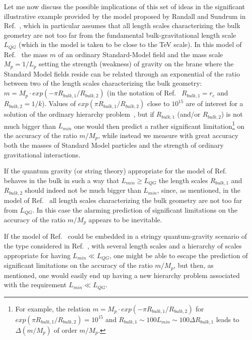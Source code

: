 Let me now discuss the possible implications of this set
of ideas in the significant illustrative example provided by
the model proposed by Randall and Sundrum in Ref.~\cite{rs1},
which in particular
assumes that all length
scales characterizing the bulk geometry are not too far from
the fundamental bulk-gravitational 
length scale $L_{QG}$ (which in the model \cite{rs1}
is taken to be close to the TeV scale).
In this model of Ref.~\cite{rs1} the mass $m$
of an ordinary Standard-Model
field and the mass scale $M_p = 1/L_p$ 
setting the strength (weakness) of gravity on the brane 
where the Standard Model fields reside
can be related through an exponential of 
the ratio between two of the length
scales characterizing the bulk
geometry: $m = M_p \cdot exp(- \pi R_{bulk,1}/R_{bulk,2})$
(in the notation of Ref.~\cite{rs1} $R_{bulk,1} = r_c$
and $R_{bulk,2} = 1/k$).
Values of $exp(\pi R_{bulk,1}/R_{bulk,2})$ close to $10^{15}$
are of interest for a solution of 
the ordinary hierarchy problem~\cite{rs1},
but if $R_{bulk,1}$ (and/or $R_{bulk,2}$)
is not much bigger than $L_{min}$ one would then 
predict a rather significant limitation\footnote{For example, 
the relation $m = M_p \cdot exp(- \pi R_{bulk,1}/R_{bulk,2})$
for $exp(\pi R_{bulk,1}/R_{bulk,2})=10^{15}$ 
and $R_{bulk,1} \sim 100 L_{min} \sim 100 \Delta R_{bulk,1}$
leads to $\Delta (m/M_p)$ of order $m/M_p$.}
on the accuracy of
the ratio $m/M_p$, while instead we measure 
with great accuracy both the masses of Standard Model particles
and the strength of ordinary gravitational interactions.

If the quantum gravity (or string theory) 
appropriate for the model of Ref.~\cite{rs1}
behaves in the bulk in such a way that
$L_{min} \ge L_{QG}$ the length scales 
$R_{bulk,1}$ and $R_{bulk,2}$
should indeed not be much bigger than $L_{min}$,
since, as mentioned,
in the model of Ref.~\cite{rs1} all length
scales characterizing the bulk geometry 
are not too far from $L_{QG}$.
In this case the alarming prediction
of significant limitations on the accuracy of
the ratio $m/M_p$ appears to be inevitable.

If the model of Ref.~\cite{rs1}
could be embedded in
a stringy quantum-gravity scenario 
of the type considered in Ref.~\cite{dbrscatt},
with several length scales
and a hierarchy of scales 
appropriate for having
$L_{min} \ll L_{QG}$,
one might be able to escape the prediction
of significant limitations on the accuracy of
the ratio $m/M_p$,
but then, as mentioned,
one would easily end up having a
new hierarchy problem associated with the
requirement $L_{min} \ll L_{QG}$.

